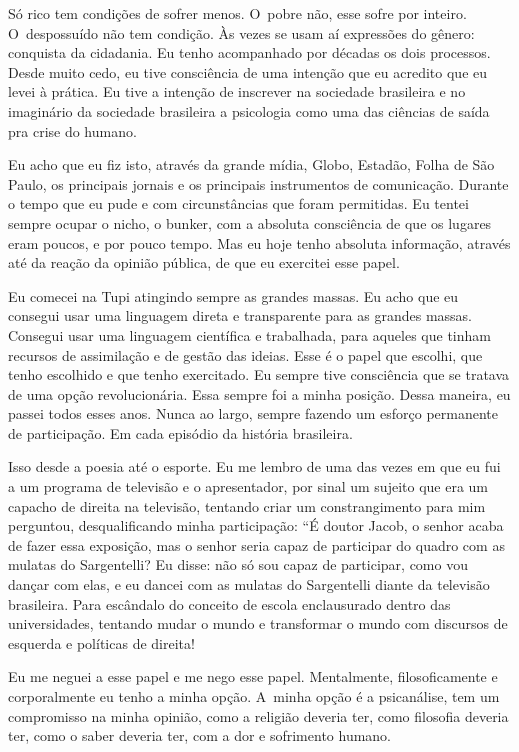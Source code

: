  

Só rico tem condições de sofrer menos. O~pobre não, esse sofre por
inteiro. O~despossuído não tem condição. Às vezes se usam aí expressões
do gênero: conquista da cidadania. Eu tenho acompanhado por décadas os
dois processos. Desde muito cedo, eu tive consciência de uma intenção
que eu acredito que eu levei à prática. Eu tive a intenção de inscrever
na sociedade brasileira e no imaginário da sociedade brasileira a
psicologia como uma das ciências de saída pra crise do humano.

 

Eu acho que eu fiz isto, através da grande mídia,  Globo, Estadão,
Folha de São Paulo, os principais jornais e os principais instrumentos
de comunicação. Durante o tempo que eu pude e com circunstâncias que
foram permitidas. Eu tentei sempre ocupar o nicho, o bunker, com a
absoluta consciência de que os lugares eram poucos, e por pouco tempo.
Mas eu hoje tenho absoluta informação, através até da reação da opinião
pública, de que eu exercitei esse papel.

 

Eu comecei na  Tupi atingindo sempre as grandes massas. Eu acho que eu
consegui usar uma linguagem direta e transparente para as grandes
massas. Consegui usar uma linguagem científica e trabalhada, para
aqueles que tinham recursos de assimilação e de gestão das ideias. Esse
é o papel que escolhi, que tenho escolhido e que tenho exercitado. Eu
sempre tive consciência que se tratava de uma opção revolucionária. Essa
sempre foi a minha posição. Dessa maneira, eu passei todos esses anos.
Nunca ao largo, sempre fazendo um esforço permanente de participação. Em
cada episódio da história brasileira.

Isso desde a poesia até o esporte. Eu me lembro de uma das vezes em que
eu fui a um programa de televisão e o apresentador, por sinal um sujeito
que era um capacho de direita na televisão, tentando criar um
constrangimento para mim perguntou, desqualificando minha participação:
``É doutor Jacob, o senhor acaba de fazer essa exposição, mas o senhor
seria capaz de participar do quadro com as mulatas do Sargentelli? Eu
disse: não só sou capaz de participar, como vou dançar com elas, e eu
dancei com as mulatas do Sargentelli diante da televisão brasileira.
Para escândalo do conceito de escola enclausurado dentro das
universidades, tentando mudar o mundo e transformar o mundo com
discursos de esquerda e políticas de direita!

Eu me neguei a esse papel e me nego esse papel. Mentalmente,
filosoficamente e corporalmente eu tenho a minha opção. A~minha opção é
a psicanálise, tem um compromisso na minha opinião, como a religião
deveria ter, como filosofia deveria ter, como o saber deveria ter, com a
dor e sofrimento humano.

